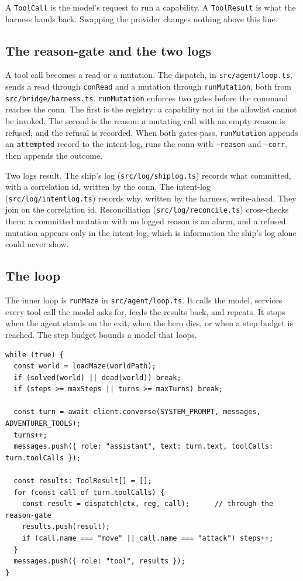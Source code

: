 \documentclass[11pt]{article}
\newcommand{\code}[1]{\texttt{#1}}
\begin{document}
A \code{ToolCall} is the model's request to run a capability. A \code{ToolResult}
is what the harness hands back. Swapping the provider changes nothing above this
line.

\subsection{The reason-gate and the two logs}

A tool call becomes a read or a mutation. The dispatch, in \code{src/agent/loop.ts},
sends a read through \code{conRead} and a mutation through \code{runMutation},
both from \code{src/bridge/harness.ts}. \code{runMutation} enforces two gates
before the command reaches the conn. The first is the registry: a capability not
in the allowlist cannot be invoked. The second is the reason: a mutating call
with an empty reason is refused, and the refusal is recorded. When both gates
pass, \code{runMutation} appends an \code{attempted} record to the intent-log,
runs the conn with \code{--reason} and \code{--corr}, then appends the outcome.

Two logs result. The ship's log (\code{src/log/shiplog.ts}) records what
committed, with a correlation id, written by the conn. The intent-log
(\code{src/log/intentlog.ts}) records why, written by the harness, write-ahead.
They join on the correlation id. Reconciliation (\code{src/log/reconcile.ts})
cross-checks them: a committed mutation with no logged reason is an alarm, and a
refused mutation appears only in the intent-log, which is information the ship's
log alone could never show.

\subsection{The loop}

The inner loop is \code{runMaze} in \code{src/agent/loop.ts}. It calls the model,
services every tool call the model asks for, feeds the results back, and repeats.
It stops when the agent stands on the exit, when the hero dies, or when a step
budget is reached. The step budget bounds a model that loops.

\begin{lstlisting}[language=TS]
while (true) {
  const world = loadMaze(worldPath);
  if (solved(world) || dead(world)) break;
  if (steps >= maxSteps || turns >= maxTurns) break;

  const turn = await client.converse(SYSTEM_PROMPT, messages, ADVENTURER_TOOLS);
  turns++;
  messages.push({ role: "assistant", text: turn.text, toolCalls: turn.toolCalls });

  const results: ToolResult[] = [];
  for (const call of turn.toolCalls) {
    const result = dispatch(ctx, reg, call);      // through the reason-gate
    results.push(result);
    if (call.name === "move" || call.name === "attack") steps++;
  }
  messages.push({ role: "tool", results });
}
\end{lstlisting}
\end{document}
